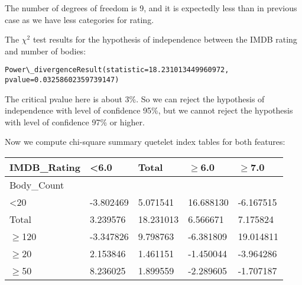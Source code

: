 \documentclass[a4paper,14pt]{article}
\renewcommand{\geq}{\ensuremath{\geqslant}}
\begin{document}
The number of degrees of freedom is 9, and it is expectedly less than in previous case as we have less categories for rating. 

The $\chi^2$ test results for the hypothesis of independence between the IMDB rating and number of bodies:

\footnotesize \begin{Verbatim}[commandchars=\\\{\}]
 Power\_divergenceResult(statistic=18.231013449960972, pvalue=0.03258602359739147)
\end{Verbatim} 
\normalsize

  The critical pvalue here is about 3\%. So we can reject the hypothesis of
independence with level of confidence 95\%, but we cannot reject the
hypothesis with level of confidence 97\% or higher.


Now we compute chi-square summary quetelet index tables for both features:
\\

\footnotesize \begin{tabular}{|l|l|l|l|l|} \hline
	IMDB\_Rating  & \textless{}6.0 & Total     & $\geq$6.0      & $\geq$7.0      \\ \hline \hline
	Body\_Count   &                &           &           &           \\ \hline
	\textless{}20 & -3.802469      & 5.071541  & 16.688130 & -6.167515 \\ \hline
	Total         & 3.239576       & 18.231013 & 6.566671  & 7.175824  \\ \hline
	$\geq$120          & -3.347826      & 9.798763  & -6.381809 & 19.014811 \\ \hline
	$\geq$20           & 2.153846       & 1.461151  & -1.450044 & -3.964286 \\ \hline
	$\geq$50           & 8.236025       & 1.899559  & -2.289605 & -1.707187 \\ \hline
\end{tabular} 
\normalsize

\vspace{0.2cm}
\end{document}
